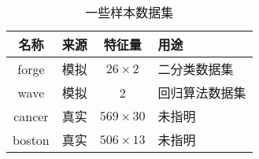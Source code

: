 \begin{table}
    \centering
    \caption{一些样本数据集}
    \begin{tabular}{cccl}
        \hline
        名称     & 来源 & 特征量            & 用途      \\
        \hline
        forge  & 模拟 & $26\times 2$   & 二分类数据集  \\
        wave   & 模拟 & 2              & 回归算法数据集 \\
        cancer & 真实 & $569\times 30$ & 未指明     \\
        boston & 真实 & $506\times 13$ & 未指明     \\
        \hline
    \end{tabular}
\end{table}
